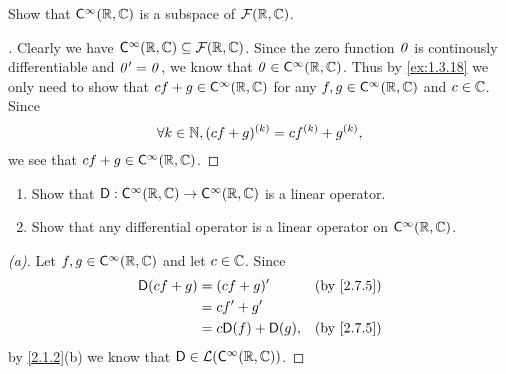 \exercisesection

\setcounter{ex}{4}
\begin{ex}\label{ex:2.7.5}
  Show that \(\cfs[\infty](\R, \C)\) is a subspace of \(\mathcal{F}(\mathbb{R}, \mathbb{C})\).
\end{ex}

\begin{proof}[]
  Clearly we have \(\cfs[\infty](\R, \C) \subseteq \fs(\R, \C)\).
  Since the zero function \(\mathit{0}\) is continously differentiable and \(\mathit{0}' = \mathit{0}\), we know that \(\zv \in \cfs[\infty](\R, \C)\).
  Thus by \cref{ex:1.3.18} we only need to show that \(cf + g \in \cfs[\infty](\R, \C)\) for any \(f, g \in \cfs[\infty](\R, \C)\) and \(c \in \mathbb{C}\).
  Since
  \[
    \forall k \in \mathbb{N}, (cf + g)^{(k)} = c f^{(k)} + g^{(k)},
  \]
  we see that \(cf + g \in \cfs[\infty](\R, \C)\).
\end{proof}

\begin{ex}\label{ex:2.7.6}
  \begin{enumerate}
    \item Show that \(\Dop : \cfs[\infty](\R, \C) \to \cfs[\infty](\R, \C)\) is a linear operator.
    \item Show that any differential operator is a linear operator on \(\cfs[\infty](\R, \C)\).
  \end{enumerate}
\end{ex}

\begin{proof}[(a)]
  Let \(f, g \in \cfs[\infty](\R, \C)\) and let \(c \in \mathbb{C}\).
  Since
  \begin{align*}
    \Dop(cf + g) & = (cf + g)'            &  & \by{2.7.5} \\
                 & = c f' + g'                            \\
                 & = c \Dop(f) + \Dop(g), &  & \by{2.7.5}
  \end{align*}
  by \cref{2.1.2}(b) we know that \(\Dop \in \ls(\cfs[\infty](\R, \C))\).
\end{proof}

